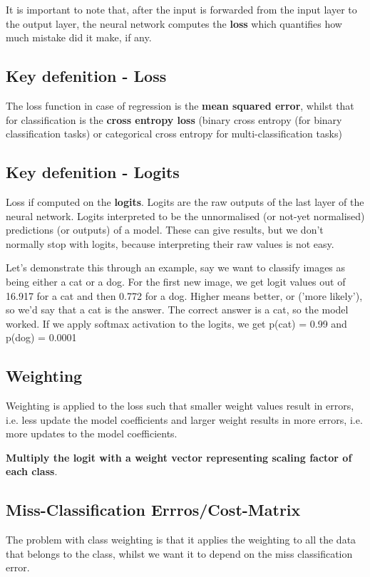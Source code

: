\documentclass{article}
\begin{document}
It is important to note that, after the input is forwarded from the input layer to the output layer, the neural network computes the \textbf{loss} which quantifies how much mistake did it make, if any. 

\subsection*{Key defenition - Loss}
The loss function in case of regression is the \textbf{mean squared error}, whilst that for classification is the \textbf{cross entropy loss} (binary cross entropy (for binary classification tasks) or categorical cross entropy for multi-classification tasks)

\subsection*{Key defenition - Logits}
Loss if computed on the \textbf{logits}. Logits are the raw outputs of the last layer of the neural network. Logits interpreted to be the unnormalised (or not-yet normalised) predictions (or outputs) of a model. These can give results, but we don't normally stop with logits, because interpreting their raw values is not easy.

Let's demonstrate this through an example, say we want to classify images as being either a cat or a dog. For the first new image, we get logit values out of 16.917 for a cat and then 0.772 for a dog. Higher means better, or ('more likely'), so we'd say that a cat is the answer. The correct answer is a cat, so the model worked. If we apply softmax activation to the logits, we get p(cat) = 0.99 and p(dog) = 0.0001

\subsection*{Weighting}
Weighting is applied to the loss such that smaller weight values result in errors, i.e. less update the model coefficients and larger weight results in more errors, i.e. more updates to the model coefficients.

\textbf{Multiply the logit with a weight vector representing scaling factor of each class}. 

\subsection*{Miss-Classification Errros/Cost-Matrix}
The problem with class weighting is that it applies the weighting to all the data that belongs to the class, whilst we want it to depend on the miss classification error.
\end{document}
